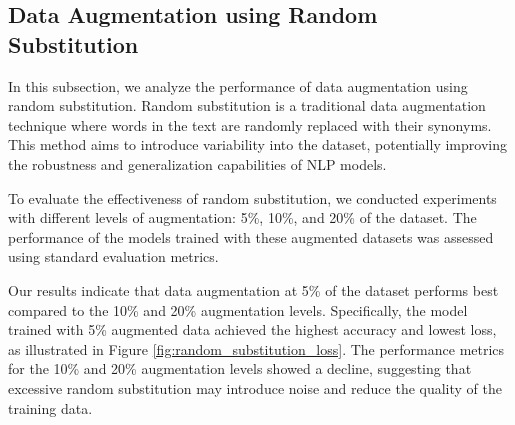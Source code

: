\documentclass{article}
\begin{document}
\subsection{Data Augmentation using Random Substitution}

In this subsection, we analyze the performance of data augmentation using
random substitution. Random substitution is a traditional data augmentation
technique where words in the text are randomly replaced with their synonyms.
This method aims to introduce variability into the dataset, potentially
improving the robustness and generalization capabilities of NLP models.

To evaluate the effectiveness of random substitution, we conducted experiments
with different levels of augmentation: 5\%, 10\%, and 20\% of the dataset. The
performance of the models trained with these augmented datasets was assessed
using standard evaluation metrics.

Our results indicate that data augmentation at 5\% of the dataset performs best
compared to the 10\% and 20\% augmentation levels. Specifically, the model
trained with 5\% augmented data achieved the highest accuracy and lowest loss,
as illustrated in Figure \ref{fig:random_substitution_loss}. The performance
metrics for the 10\% and 20\% augmentation levels showed a decline, suggesting
that excessive random substitution may introduce noise and reduce the quality
of the training data.
\end{document}

